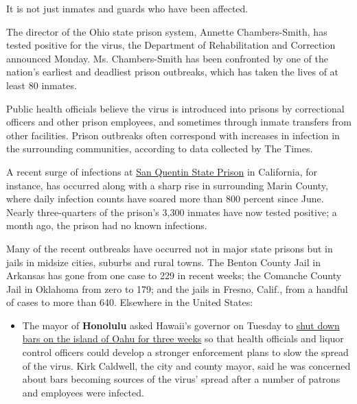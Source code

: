 It is not just inmates and guards who have been affected.

The director of the Ohio state prison system, Annette Chambers-Smith,
has tested positive for the virus, the Department of Rehabilitation and
Correction announced Monday. Ms. Chambers-Smith has been confronted by
one of the nation's earliest and deadliest prison outbreaks, which has
taken the lives of at least 80 inmates.

Public health officials believe the virus is introduced into prisons by
correctional officers and other prison employees, and sometimes through
inmate transfers from other facilities. Prison outbreaks often
correspond with increases in infection in the surrounding communities,
according to data collected by The Times.

A recent surge of infections at
\href{https://www.nytimes3xbfgragh.onion/2020/06/30/us/san-quentin-prison-coronavirus.html}{San
Quentin State Prison} in California, for instance, has occurred along
with a sharp rise in surrounding Marin County, where daily infection
counts have soared more than 800 percent since June. Nearly
three-quarters of the prison's 3,300 inmates have now tested positive; a
month ago, the prison had no known infections.

Many of the recent outbreaks have occurred not in major state prisons
but in jails in midsize cities, suburbs and rural towns. The Benton
County Jail in Arkansas has gone from one case to 229 in recent weeks;
the Comanche County Jail in Oklahoma from zero to 179; and the jails in
Fresno, Calif., from a handful of cases to more than 640. Elsewhere in
the United States:

\begin{itemize}
\tightlist
\item
  The mayor of \textbf{Honolulu} asked Hawaii's governor on Tuesday to
  \href{https://www.facebookcorewwwi.onion/MayorKirk/videos/352413472441811/}{shut
  down bars on the island of Oahu for three weeks} so that health
  officials and liquor control officers could develop a stronger
  enforcement plans to slow the spread of the virus. Kirk Caldwell, the
  city and county mayor, said he was concerned about bars becoming
  sources of the virus' spread after a number of patrons and employees
  were infected.
\end{itemize}

